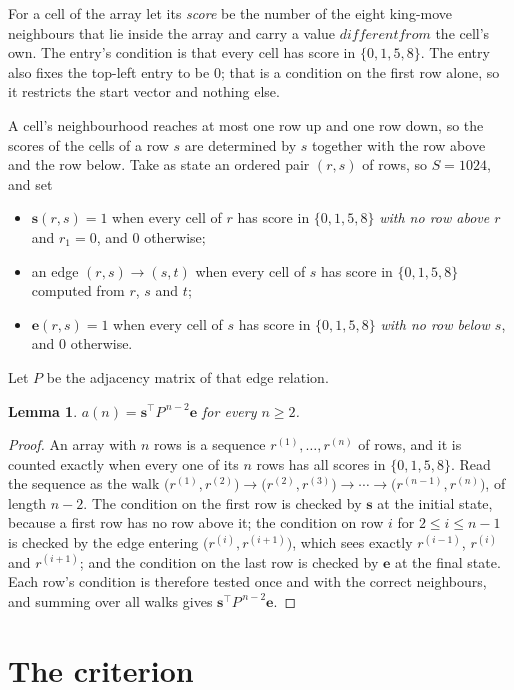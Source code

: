 \documentclass[11pt,a4paper]{article}
\theoremstyle{plain}
\newtheorem{lemma}[theorem]{Lemma}
\theoremstyle{definition}
\begin{document}
For a cell of the array let its \emph{score} be the number of the eight king-move neighbours that lie inside
the array and carry a value $different from$ the cell's own. The entry's condition is that every cell
has score in $\{0,1,5,8\}$. The entry also fixes the top-left entry to be $0$; that is a condition on the first row alone, so it restricts the start vector and nothing else.

A cell's neighbourhood reaches at most one row up and one row down, so the scores of the
cells of a row $s$ are determined by $s$ together with the row above and the row below.
Take as state an ordered pair $(r,s)$ of rows, so $S=1024$, and set
\begin{itemize}
\item $\mathbf{s}(r,s)=1$ when every cell of $r$ has score in $\{0,1,5,8\}$ \emph{with no row
above $r$} and $r_1=0$, and $0$ otherwise;
\item an edge $(r,s)\to(s,t)$ when every cell of $s$ has score in $\{0,1,5,8\}$ computed from
$r$, $s$ and $t$;
\item $\mathbf{e}(r,s)=1$ when every cell of $s$ has score in $\{0,1,5,8\}$ \emph{with no row
below $s$}, and $0$ otherwise.
\end{itemize}
Let $P$ be the adjacency matrix of that edge relation.

\begin{lemma}\label{lem:walk}
$a(n)=\mathbf{s}^{\!\top}P^{\,n-2}\mathbf{e}$ for every $n\ge2$.
\end{lemma}

\begin{proof}
An array with $n$ rows is a sequence $r^{(1)},\dots,r^{(n)}$ of rows, and it is counted
exactly when every one of its $n$ rows has all scores in $\{0,1,5,8\}$. Read the sequence as the
walk $\bigl(r^{(1)},r^{(2)}\bigr)\to\bigl(r^{(2)},r^{(3)}\bigr)\to\cdots\to
\bigl(r^{(n-1)},r^{(n)}\bigr)$, of length $n-2$. The condition on the first row is
checked by $\mathbf{s}$ at the initial state, because a first row has no row above it; the
condition on row $i$ for $2\le i\le n-1$ is checked by the edge entering
$\bigl(r^{(i)},r^{(i+1)}\bigr)$, which sees exactly $r^{(i-1)}$, $r^{(i)}$ and
$r^{(i+1)}$; and the condition on the last row is checked by $\mathbf{e}$ at the final
state. Each row's condition is therefore tested once and with the correct neighbours, and
summing over all walks gives $\mathbf{s}^{\!\top}P^{\,n-2}\mathbf{e}$.
\end{proof}

\section{The criterion}
\end{document}
